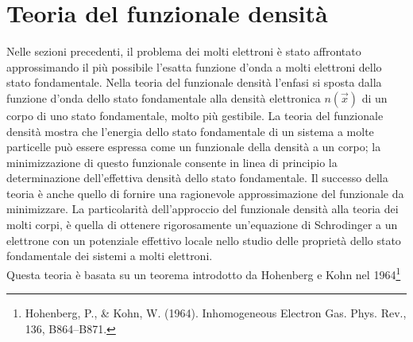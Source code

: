 \section{Teoria del funzionale densità}
Nelle sezioni precedenti, il problema dei molti elettroni è stato affrontato approssimando il più possibile l'esatta funzione d'onda a molti elettroni dello stato fondamentale. Nella teoria del funzionale densità l'enfasi si sposta dalla funzione d'onda dello stato fondamentale alla densità elettronica $n(\vec x)$ di un corpo di uno stato fondamentale, molto più gestibile. La teoria del funzionale  densità mostra che l'energia dello stato fondamentale di un sistema a molte particelle può essere espressa come un funzionale della densità a un corpo; la minimizzazione di questo funzionale consente in linea di principio la determinazione dell'effettiva densità dello stato fondamentale. Il successo della teoria è anche quello di fornire una ragionevole approssimazione del funzionale da minimizzare. La particolarità dell'approccio del funzionale densità alla teoria dei molti corpi, è quella di ottenere rigorosamente un'equazione di Schrodinger a un elettrone con un potenziale effettivo locale nello studio delle proprietà dello stato fondamentale dei sistemi a molti elettroni.\\
Questa teoria è basata su un teorema introdotto da Hohenberg e Kohn nel 1964\footnote{Hohenberg, P., \& Kohn, W. (1964). Inhomogeneous Electron Gas. Phys. Rev., 136, B864–B871.}
